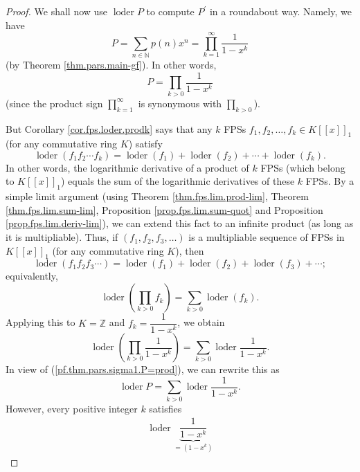 \begin{proof}
We shall now use $\operatorname*{loder}P$ to compute $P^{\prime}$ in a
roundabout way. Namely, we have%
\[
P=\sum_{n\in\mathbb{N}}p\left(  n\right)  x^{n}=\prod_{k=1}^{\infty}\dfrac
{1}{1-x^{k}}%
\]
(by Theorem \ref{thm.pars.main-gf}). In other words,%
\begin{equation}
P=\prod_{k>0}\dfrac{1}{1-x^{k}} \label{pf.thm.pars.sigma1.P=prod}%
\end{equation}
(since the product sign $\prod\limits_{k=1}^{\infty}$ is synonymous with
$\prod\limits_{k>0}$).

But Corollary \ref{cor.fps.loder.prodk} says that any $k$ FPSs $f_{1}%
,f_{2},\ldots,f_{k}\in K\left[  \left[  x\right]  \right]  _{1}$ (for any
commutative ring $K$) satisfy%
\[
\operatorname*{loder}\left(  f_{1}f_{2}\cdots f_{k}\right)
=\operatorname*{loder}\left(  f_{1}\right)  +\operatorname*{loder}\left(
f_{2}\right)  +\cdots+\operatorname*{loder}\left(  f_{k}\right)  .
\]
In other words, the logarithmic derivative of a product of $k$ FPSs (which
belong to $K\left[  \left[  x\right]  \right]  _{1}$) equals the sum of the
logarithmic derivatives of these $k$ FPSs. By a simple limit argument (using
Theorem \ref{thm.fps.lim.prod-lim}, Theorem \ref{thm.fps.lim.sum-lim},
Proposition \ref{prop.fps.lim.sum-quot} and Proposition
\ref{prop.fps.lim.deriv-lim}), we can extend this fact to an infinite product
(as long as it is multipliable). Thus, if $\left(  f_{1},f_{2},f_{3}%
,\ldots\right)  $ is a multipliable sequence of FPSs in $K\left[  \left[
x\right]  \right]  _{1}$ (for any commutative ring $K$), then%
\[
\operatorname*{loder}\left(  f_{1}f_{2}f_{3}\cdots\right)
=\operatorname*{loder}\left(  f_{1}\right)  +\operatorname*{loder}\left(
f_{2}\right)  +\operatorname*{loder}\left(  f_{3}\right)  +\cdots;
\]
equivalently,%
\[
\operatorname*{loder}\left(  \prod_{k>0}f_{k}\right)  =\sum_{k>0}%
\operatorname*{loder}\left(  f_{k}\right)  .
\]
Applying this to $K=\mathbb{Z}$ and $f_{k}=\dfrac{1}{1-x^{k}}$, we obtain%
\[
\operatorname*{loder}\left(  \prod_{k>0}\dfrac{1}{1-x^{k}}\right)  =\sum
_{k>0}\operatorname*{loder}\dfrac{1}{1-x^{k}}.
\]
In view of (\ref{pf.thm.pars.sigma1.P=prod}), we can rewrite this as%
\begin{equation}
\operatorname*{loder}P=\sum_{k>0}\operatorname*{loder}\dfrac{1}{1-x^{k}}.
\label{pf.thm.pars.sigma1.loderP=sumk}%
\end{equation}
However, every positive integer $k$ satisfies%
\begin{align*}
\operatorname*{loder}\underbrace{\dfrac{1}{1-x^{k}}}_{=\left(  1-x^{k}\right)
}
\end{align*}
\end{proof}
